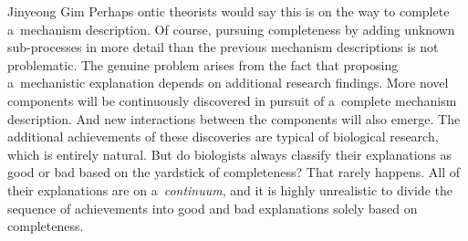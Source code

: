 \begin{artengenv}{Jinyeong Gim}
Perhaps ontic theorists would say this is on the way to complete a~mechanism description. Of course, pursuing completeness by adding unknown sub-processes in more detail than the previous mechanism descriptions is not problematic. The genuine problem arises from the fact that proposing a~mechanistic explanation depends on additional research findings. More novel components will be continuously discovered in pursuit of a~complete mechanism description. And new interactions between the components will also emerge. The additional achievements of these discoveries are typical of biological research, which is entirely natural. But do biologists always classify their explanations as good or bad based on the yardstick of completeness? That rarely happens. All of their explanations are on a~\textit{continuum}, and it is highly unrealistic to divide the sequence of achievements into good and bad explanations solely based on completeness.


\end{artengenv}
